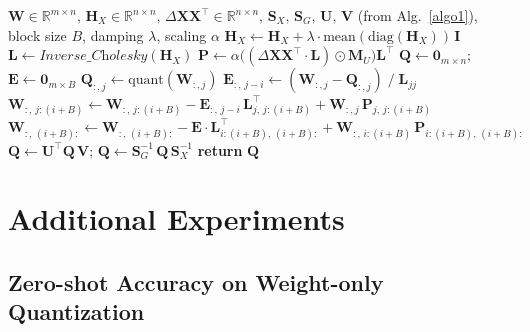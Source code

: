 \documentclass{article} %
\begin{document}
\begin{algorithm}[H]
\caption{KronQ -- Quantization Loop}
\label{algo2}

\small
\begin{algorithmic}[1]
\Require $\mathbf{W} \in \mathbb{R}^{m \times n},\,
          \mathbf{H}_X \in \mathbb{R}^{n \times n},\,
          \Delta\mathbf{X}\mathbf{X}^\top \in \mathbb{R}^{n \times n},\,
          \mathbf{S}_X,\, \mathbf{S}_G,\, \mathbf{U},\, \mathbf{V}$
         (from Alg.~\ref{algo1}),
         block size $B$, damping $\lambda$, scaling $\alpha$
\State $\mathbf{H}_X \leftarrow \mathbf{H}_X + \lambda \cdot \mathrm{mean}(\mathrm{diag}(\mathbf{H}_X))\,\mathbf{I}$
\State $\mathbf{L} \leftarrow \textit{Inverse\_Cholesky}(\mathbf{H}_X)$
\State $\mathbf{P} \leftarrow \alpha\bigl((\Delta\mathbf{X}\mathbf{X}^\top \cdot \mathbf{L}) \odot \mathbf{M}_U\bigr)\mathbf{L}^\top$
\State $\mathbf{Q} \leftarrow \mathbf{0}_{m \times n}$;\quad
       $\mathbf{E} \leftarrow \mathbf{0}_{m \times B}$
        \State $\mathbf{Q}_{:,j} \leftarrow \mathrm{quant}(\mathbf{W}_{:,j})$
        \State $\mathbf{E}_{:,\,j-i} \leftarrow (\mathbf{W}_{:,j} - \mathbf{Q}_{:,j})\;/\;\mathbf{L}_{jj}$
        \State $\mathbf{W}_{:,\,j:(i+B)} \leftarrow \mathbf{W}_{:,\,j:(i+B)}
                - \mathbf{E}_{:,\,j-i}\,\mathbf{L}_{j,\,j:(i+B)}^\top
                + \mathbf{W}_{:,j}\,\mathbf{P}_{j,\,j:(i+B)}$
    \EndFor
    \State $\mathbf{W}_{:,\,(i+B):} \leftarrow \mathbf{W}_{:,\,(i+B):}
            - \mathbf{E}\cdot\mathbf{L}_{i:(i+B),\,(i+B):}^\top
            + \mathbf{W}_{:,\,i:(i+B)}\,\mathbf{P}_{i:(i+B),\,(i+B):}$
\EndFor
\State $\mathbf{Q} \leftarrow \mathbf{U}^\top \mathbf{Q}\,\mathbf{V}$;\quad
       $\mathbf{Q} \leftarrow \mathbf{S}_G^{-1}\,\mathbf{Q}\,\mathbf{S}_X^{-1}$
\State \textbf{return} $\mathbf{Q}$
\end{algorithmic}
\end{algorithm}


\section{Additional Experiments}

\subsection{Zero-shot Accuracy on Weight-only Quantization}
\label{appendix:weight_only_zs}
\end{document}
